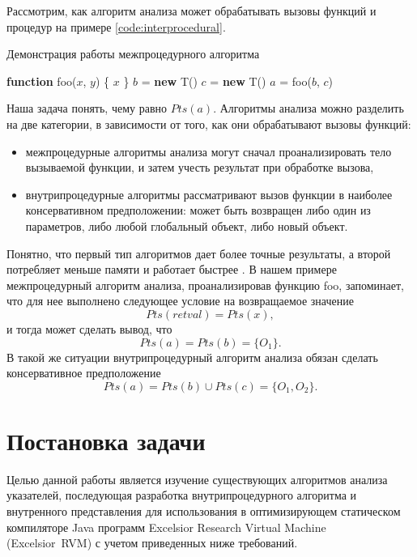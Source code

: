 \documentclass[14pt,titlepage]{extarticle}
\newcommand{\NEW}{\textbf{new }}
\newcommand{\FUNCTION}{\textbf{function }}
\newcommand{\eng}[1]{{\English#1}}
\begin{document}
    Рассмотрим, как алгоритм анализа может обрабатывать вызовы
    функций и процедур на примере \ref{code:interprocedural}.
    \begin{algorithm}
      \caption{Демонстрация работы межпроцедурного алгоритма}
      \label{code:interprocedural}
      \begin{algorithmic}[1]
        \STATE \FUNCTION foo($x$, $y$) \{
        \RETURN $x$
        \STATE \}
        \STATE
        \STATE $b$ = \NEW T()
        \STATE $c$ = \NEW T()
        \STATE $a$ = foo($b$, $c$)
      \end{algorithmic}
    \end{algorithm}
    Наша задача понять, чему равно $Pts(a)$.
    Алгоритмы анализа можно разделить на две категории, в зависимости от того,
    как они обрабатывают вызовы функций:
    \begin{itemize}
      \item межпроцедурные алгоритмы анализа могут сначал проанализировать
            тело вызываемой функции, и затем учесть результат при обработке
            вызова,
      \item внутрипроцедурные алгоритмы рассматривают вызов функции в наиболее
            консервативном предположении: может быть возвращен либо один из
            параметров, либо любой глобальный объект, либо новый объект.
    \end{itemize}
    Понятно, что первый тип алгоритмов дает более точные результаты,
    а второй потребляет меньше памяти и работает быстрее
    \cite[с.~117]{andersen}.
    В нашем примере межпроцедурный алгоритм анализа, проанализировав функцию
    foo, запоминает, что для нее выполнено следующее условие на возвращаемое
    значение
    \[Pts(retval) = Pts(x),\]
    и тогда может сделать вывод, что \[Pts(a) = Pts(b) = \{O_1\}.\]
    В такой же ситуации внутрипроцедурный алгоритм анализа обязан сделать
    консервативное предположение
    \[Pts(a) = Pts(b) \cup Pts(c) = \{O_1, O_2\}.\]

  \newpage
  \section{Постановка задачи}

    Целью данной работы является изучение существующих алгоритмов анализа
    указателей, последующая разработка внутрипроцедурного алгоритма и
    внутренного представления для использования в оптимизирующем
    статическом компиляторе Java программ
    \eng{Excelsior Research Virtual Machine (Excelsior~RVM)}
    с учетом приведенных ниже требований.
\end{document}
